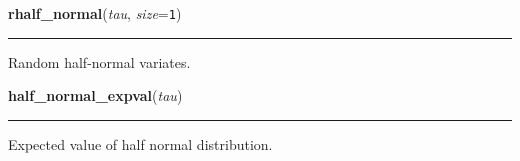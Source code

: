     \begin{boxedminipage}{\textwidth}

    \raggedright \textbf{rhalf\_normal}(\textit{tau}, \textit{size}=\texttt{1})

    \vspace{-1.5ex}

    \rule{\textwidth}{0.5\fboxrule}

Random half-normal variates.
    \vspace{1ex}

    \end{boxedminipage}

    \label{pymc:distributions:half_normal_expval}

    \vspace{0.5ex}

    \begin{boxedminipage}{\textwidth}

    \raggedright \textbf{half\_normal\_expval}(\textit{tau})

    \vspace{-1.5ex}

    \rule{\textwidth}{0.5\fboxrule}

Expected value of half normal distribution.
    \vspace{1ex}

    \end{boxedminipage}

    \label{pymc:distributions:half_normal_like}

    \vspace{0.5ex}

